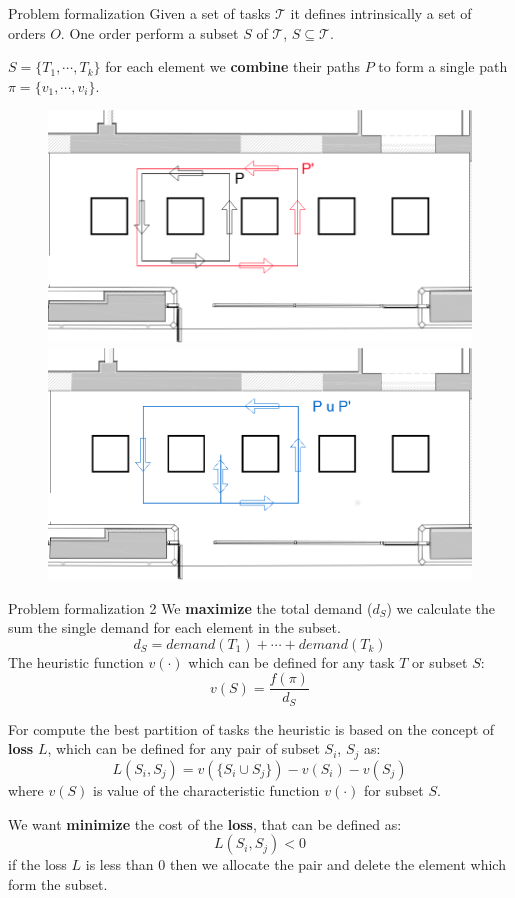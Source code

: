     \begin{frame}[fragile]{Problem formalization}
        Given a set of tasks $\mathcal{T}$ it defines intrinsically a set of orders $O$.
        One order perform a subset $S$ of $\mathcal{T}$, $S\subseteq\mathcal{T}$.

        $S = \{T_1,\cdots,T_k\}$ for each element we {\bf combine} their paths $P$ to form
        a single path $\pi = \{v_1,\cdots,v_i\}$.
        \begin{figure}
           
                \includegraphics[scale=0.18]{img/p1p2_cut.png}
                \includegraphics[scale=0.18]{img/p3_cut.png}

        \end{figure}
    \end{frame}

    \begin{frame}[fragile]{Problem formalization 2}
       We {\bf maximize} the total demand ($d_S$) we calculate the sum the single demand for each element in the subset.
\[d_S =demand(T_1) + \cdots + demand(T_k)\]
The heuristic function $v(\cdot)$ which
can be defined for any task $T$ or subset $S$:
\[ v(S) = \frac{f(\pi)}{d_S}\]

For compute the best partition of tasks the heuristic is based on the concept of {\bf loss} $L$,
which can be defined for any pair of subset $S_i$, $S_j$ as:
\[L(S_i,S_j) = v(\{ S_i \cup S_j\}) - v(S_i) - v(S_j)\]
where $v(S)$ is value of the characteristic function $v(\cdot)$ for subset $S$.

We want {\bf minimize} the cost of the {\bf loss}, that can be defined as:
\[L(S_i,S_j) < 0 \]
if the loss $L$ is less than 0 then we allocate the pair and delete the element which
form the subset.
    \end{frame}

